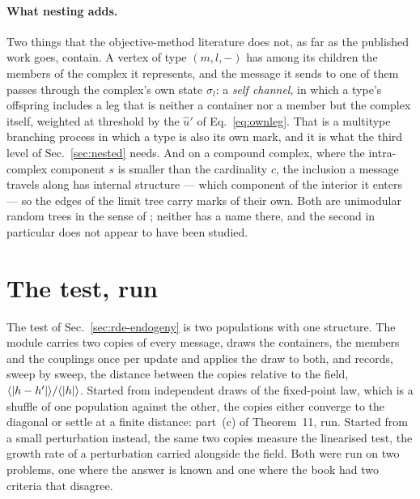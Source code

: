 \paragraph{What nesting adds.} Two things that the objective-method
literature does not, as far as the published work goes, contain. A vertex of
type $(m,l,-)$ has among its children the members of the complex it
represents, and the message it sends to one of them passes through the
complex's own state $\sigma_{l}$: a \emph{self channel}, in which a type's
offspring includes a leg that is neither a container nor a member but the
complex itself, weighted at threshold by the $\hat u'$ of
Eq.~\eqref{eq:ownleg}. That is a multitype branching process in which a
type is also its own mark, and it is what the third level of
Sec.~\ref{sec:nested} needs. And on a compound complex, where the
intra-complex component $s$ is smaller than the cardinality $c$, the
inclusion a message travels along has internal structure --- which
component of the interior it enters --- so the edges of the limit tree
carry marks of their own. Both are unimodular random trees in the sense of
\citet{aldouslyons2007}; neither has a name there, and the second in particular
does not appear to have been studied.


\section{The test, run}
\label{sec:rde-computed}

The test of Sec.~\ref{sec:rde-endogeny} is two populations with one
structure. The module  carries two copies of every
message, draws the containers, the members and the couplings once per
update and applies the draw to both, and records, sweep by sweep, the
distance between the copies relative to the field,
$\langle |h-h'| \rangle/\langle |h| \rangle$. Started from independent
draws of the fixed-point law, which is a shuffle of one population against
the other, the copies either converge to the diagonal or settle at a finite
distance: part~(c) of Theorem~11, run. Started from a small perturbation
instead, the same two copies measure the linearised test, the growth rate
of a perturbation carried alongside the field. Both were run on two
problems, one where the answer is known and one where the book had two
criteria that disagree.

